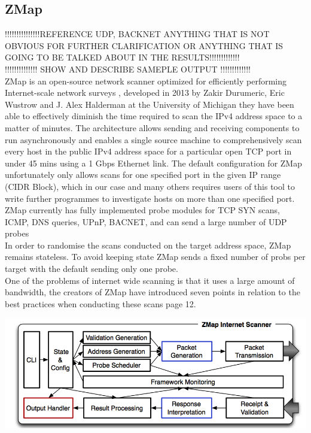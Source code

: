 \documentclass[a4wide,leqno,12pt]{report}
\begin{document}
\subsection{ZMap}
!!!!!!!!!!!!!!!REFERENCE UDP, BACKNET ANYTHING THAT IS NOT OBVIOUS FOR FURTHER CLARIFICATION OR ANYTHING THAT IS GOING TO BE TALKED ABOUT IN THE RESULTS!!!!!!!!!!!!!\\


!!!!!!!!!!!!!! SHOW AND DESCRIBE SAMEPLE OUTPUT !!!!!!!!!!!!!\\




ZMap is an open-source network scanner optimized for efficiently performing
Internet-scale network surveys \cite{durumeric2013zmap}, developed in 2013 by Zakir Durumeric, Eric Wustrow and J. Alex Halderman at the University of Michigan they have been able to effectively diminish the time required to scan the IPv4 address space to a matter of minutes. The architecture allows sending and receiving components
to run asynchronously and enables a single source machine to comprehensively scan every host in the public IPv4
address space for a particular open TCP port in under 45 mins using a 1 Gbps Ethernet link\cite{durumeric2013zmap}. The default configuration for ZMap unfortunately only allows scans for one specified port in the given IP range (CIDR Block), which in our case and many others requires users of this tool to write further programmes to investigate hosts on more than one specified port. ZMap currently has fully implemented probe modules for TCP SYN scans, ICMP, DNS queries, UPnP, BACNET, and can send a large number of UDP probes \cite{zmapGithub}\\


In order to randomise the scans conducted on the target address space, ZMap remains stateless. To avoid keeping state ZMap sends a fixed number of probs per target with the default sending only one probe.\cite{durumeric2013zmap}\\

One of the problems of internet wide scanning is that it uses a large amount of bandwidth,
the creators of ZMap have introduced seven points in relation to the best practices when conducting these scans\cite{durumeric2013zmap} page 12. \\


\begin{center}
\includegraphics[scale=.4]{images/zmap_architecture.png}
\end{center}
\end{document}
